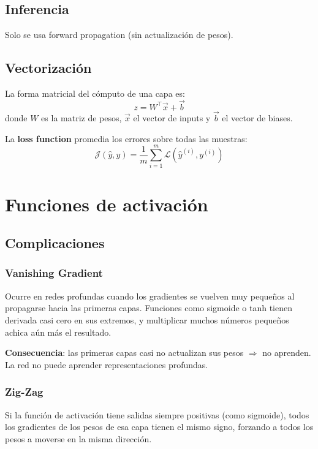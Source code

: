 \documentclass[12pt, a4paper]{article}
\begin{document}
\subsection{Inferencia}

Solo se usa forward propagation (sin actualización de pesos).

\subsection{Vectorización}

La forma matricial del cómputo de una capa es:
\[
	z = W^{\top}\vec{x} + \vec{b}
\]
donde $W$ es la matriz de pesos, $\vec{x}$ el vector de inputs y $\vec{b}$ el vector de biases.

La \textbf{loss function} promedia los errores sobre todas las muestras:
\[
	\mathcal{J}(\hat{y}, y) = \frac{1}{m} \sum_{i=1}^{m} \mathcal{L}(\hat{y}^{(i)}, y^{(i)})
\]

\section{Funciones de activación}

\subsection{Complicaciones}

\subsubsection{Vanishing Gradient}
Ocurre en redes profundas cuando los gradientes se vuelven muy pequeños al propagarse hacia las primeras capas. Funciones como sigmoide o tanh tienen derivada casi cero en sus extremos, y multiplicar muchos números pequeños achica aún más el resultado.

\textbf{Consecuencia}: las primeras capas casi no actualizan sus pesos $\Rightarrow$ no aprenden. La red no puede aprender representaciones profundas.

\subsubsection{Zig-Zag}
Si la función de activación tiene salidas siempre positivas (como sigmoide), todos los gradientes de los pesos de esa capa tienen el mismo signo, forzando a todos los pesos a moverse en la misma dirección.
\end{document}
